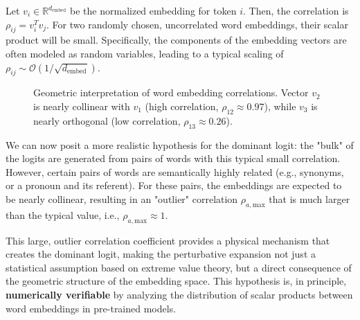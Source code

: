 \documentclass[12pt]{article}
\begin{document}
Let $v_i \in \mathbb{R}^{d_{\text{embed}}}$ be the normalized embedding for token $i$. Then, the correlation is $\rho_{ij} = v_i^T v_j$. For two randomly chosen, uncorrelated word embeddings, their scalar product will be small. Specifically, the components of the embedding vectors are often modeled as random variables, leading to a typical scaling of $\rho_{ij} \sim \mathcal{O}(1/\sqrt{d_{\text{embed}}})$.

\begin{figure}[h]
\centering
{}
\caption{Geometric interpretation of word embedding correlations. Vector $v_2$ is nearly collinear with $v_1$ (high correlation, $\rho_{12} \approx 0.97$), while $v_3$ is nearly orthogonal (low correlation, $\rho_{13} \approx 0.26$).}
\end{figure}

We can now posit a more realistic hypothesis for the dominant logit: the "bulk" of the logits are generated from pairs of words with this typical small correlation. However, certain pairs of words are semantically highly related (e.g., synonyms, or a pronoun and its referent). For these pairs, the embeddings are expected to be nearly collinear, resulting in an "outlier" correlation $\rho_{a, \text{max}}$ that is much larger than the typical value, i.e., $\rho_{a, \text{max}} \approx 1$.

This large, outlier correlation coefficient provides a physical mechanism that creates the dominant logit, making the perturbative expansion not just a statistical assumption based on extreme value theory, but a direct consequence of the geometric structure of the embedding space. This hypothesis is, in principle, \textbf{numerically verifiable} by analyzing the distribution of scalar products between word embeddings in pre-trained models.
\end{document}
